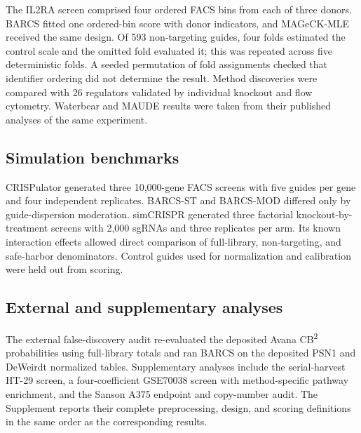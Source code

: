 The IL2RA screen comprised four ordered FACS bins from each of three donors.
BARCS fitted one ordered-bin score with donor indicators, and MAGeCK-MLE
received the same design.  Of 593 non-targeting guides, four folds estimated
the control scale and the omitted fold evaluated it; this was repeated across
five deterministic folds.  A seeded permutation of fold assignments checked
that identifier ordering did not determine the result.  Method discoveries
were compared with 26 regulators
validated by individual knockout and flow cytometry.  Waterbear and MAUDE
results were taken from their published analyses of the same experiment.

\subsection{Simulation benchmarks}

CRISPulator generated three 10,000-gene FACS screens with five guides per gene
and four independent replicates.  BARCS-ST and BARCS-MOD differed only by
guide-dispersion moderation.  simCRISPR generated three factorial
knockout-by-treatment screens with 2,000 sgRNAs and three replicates per arm.
Its known interaction effects allowed direct comparison of full-library,
non-targeting, and safe-harbor denominators.  Control guides used for
normalization and calibration were held out from scoring.

\subsection{External and supplementary analyses}

The external false-discovery audit re-evaluated the deposited Avana
CB\textsuperscript{2} probabilities using full-library totals and ran BARCS on
the deposited PSN1 and DeWeirdt normalized tables.  Supplementary analyses
include the serial-harvest HT-29 screen, a four-coefficient GSE70038 screen
with method-specific pathway enrichment, and the Sanson A375 endpoint and
copy-number audit.  The Supplement reports their complete preprocessing,
design, and scoring definitions in the same order as the corresponding
results.
